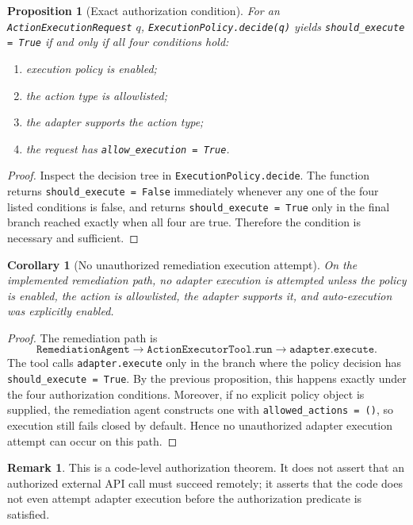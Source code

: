 \documentclass[11pt]{article}
\newtheorem{proposition}{Proposition}
\newtheorem{corollary}{Corollary}
\theoremstyle{definition}
\newtheorem{remark}{Remark}
\begin{document}
\begin{proposition}[Exact authorization condition]
For an \texttt{ActionExecutionRequest} \(q\), \texttt{ExecutionPolicy.decide(q)} yields
\texttt{should\_execute = True} if and only if all four conditions hold:
\begin{enumerate}[label=(\roman*)]
\item execution policy is enabled;
\item the action type is allowlisted;
\item the adapter supports the action type;
\item the request has \texttt{allow\_execution = True}.
\end{enumerate}
\end{proposition}

\begin{proof}
Inspect the decision tree in \texttt{ExecutionPolicy.decide}. The function returns
\texttt{should\_execute = False} immediately whenever any one of the four listed conditions is
false, and returns \texttt{should\_execute = True} only in the final branch reached exactly when
all four are true. Therefore the condition is necessary and sufficient.
\end{proof}

\begin{corollary}[No unauthorized remediation execution attempt]
On the implemented remediation path, no adapter execution is attempted unless the policy is enabled,
the action is allowlisted, the adapter supports it, and auto-execution was explicitly enabled.
\end{corollary}

\begin{proof}
The remediation path is
\[
\texttt{RemediationAgent} \rightarrow \texttt{ActionExecutorTool.run} \rightarrow \texttt{adapter.execute}.
\]
The tool calls \texttt{adapter.execute} only in the branch where the policy decision has
\texttt{should\_execute = True}. By the previous proposition, this happens exactly under the four
authorization conditions. Moreover, if no explicit policy object is supplied, the remediation
agent constructs one with \texttt{allowed\_actions = ()}, so execution still fails closed by
default. Hence no unauthorized adapter execution attempt can occur on this path.
\end{proof}

\begin{remark}
This is a code-level authorization theorem. It does not assert that an authorized external API
call must succeed remotely; it asserts that the code does not even attempt adapter execution
before the authorization predicate is satisfied.
\end{remark}
\end{document}
